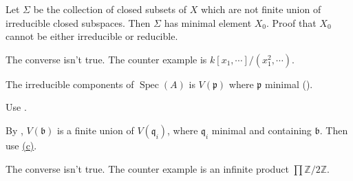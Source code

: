 \begin{exercise}\label{ex6.7}
	Let $\Sigma$ be the collection of closed subsets of $X$ which are not finite union of irreducible closed subspaces. Then $\Sigma$ has minimal element $X_0$. Proof that $X_0$ cannot be either irreducible or reducible.
\end{exercise}

\begin{exercise}\label{ex6.8}
	The converse isn't true. The counter example is $k[x_1,\cdots]/\left(x_1^2,\cdots\right)$.
\end{exercise}

\begin{exercise}\label{ex6.9}
	The irreducible components of $\operatorname{Spec}(A)$ is $V(\mathfrak{p})$ where $\mathfrak{p}$ minimal ().
\end{exercise}

\begin{exercise}\label{ex6.10}
	Use .
\end{exercise}

\begin{exercise}\label{ex6.11}
	By , $V(\mathfrak{b})$ is a finite union of $V(\mathfrak{q}_i)$, where $\mathfrak{q}_i$ minimal and containing $\mathfrak{b}$. Then use \hyperref[ex5.10]{(c)}.
\end{exercise}

\begin{exercise}\label{ex6.12}
	The converse isn't true. The counter example is an infinite product $\prod\mathbb{Z}/2\mathbb{Z}$.
\end{exercise}